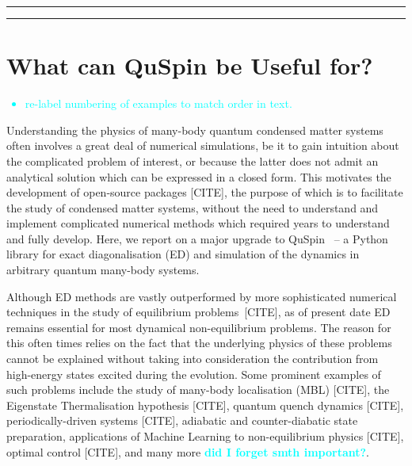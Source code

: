 \documentclass{SciPost}
\newcommand\0{\scalebox{-1}[1]{0}}
\newcommand*{\cyan}{\textcolor{cyan}}
\begin{document}
\vspace{10pt}
\noindent\rule{\textwidth}{1pt}
\tableofcontents\thispagestyle{fancy}
\noindent\rule{\textwidth}{1pt}
\vspace{10pt}


\section{What can QuSpin be Useful for?}
\label{sec:intro}

\cyan{
\begin{itemize}
	\item re-label numbering of examples to match order in text.
\end{itemize}
	}

Understanding the physics of many-body quantum condensed matter systems often involves a great deal of numerical simulations, be it to gain intuition about the complicated problem of interest, or because the latter does not admit an analytical solution which can be expressed in a closed form. This motivates the development of open-source packages [CITE], the purpose of which is to facilitate the study of condensed matter systems, without the need to understand and implement complicated numerical methods which required years to understand and fully develop. Here, we report on a major upgrade to QuSpin~\cite{weinberg_17_quspin} -- a Python library for exact diagonalisation (ED) and simulation of the dynamics in arbitrary quantum many-body systems. 

Although ED methods are vastly outperformed by more sophisticated numerical techniques in the study of equilibrium problems~[CITE], as of present date ED remains essential for most dynamical non-equilibrium problems. The reason for this often times relies on the fact that the underlying physics of these problems cannot be explained without taking into consideration the contribution from high-energy states excited during the evolution. Some prominent examples of such problems include the study of many-body localisation (MBL) [CITE], the Eigenstate Thermalisation hypothesis [CITE], quantum quench dynamics [CITE], periodically-driven systems [CITE], adiabatic and counter-diabatic state preparation, applications of Machine Learning to non-equilibrium physics [CITE], optimal control [CITE], and many more \cyan{\bf did I forget smth important?}.
\end{document}
